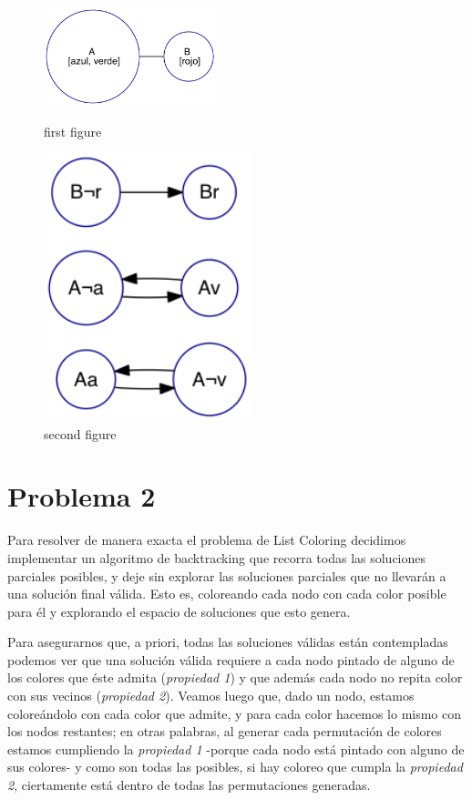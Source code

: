 \documentclass{article}
\theoremstyle{definition}
\theoremstyle{remark}
\begin{document}
\begin{figure}
\centering
\begin{minipage}{0.45\textwidth}
\centering
\includegraphics[width=5cm]{graphs/ej1/ej1_intro_2n.png}
\caption{first figure}
\end{minipage}\hfill
\begin{minipage}{0.45\textwidth}
\centering
\includegraphics[width=6cm]{graphs/ej1/ej1_intro_2n_impl.png}
\caption{second figure}
\end{minipage}
\end{figure}


\section{Problema 2}

Para resolver de manera exacta el problema de List Coloring decidimos implementar un algoritmo de backtracking que recorra todas las soluciones parciales posibles, y deje sin explorar las soluciones parciales que no llevarán a una solución final válida. Esto es, coloreando cada nodo con cada color posible para él y explorando el espacio de soluciones que esto genera. 

Para asegurarnos que, a priori, todas las soluciones válidas están contempladas podemos ver que una solución válida requiere a cada nodo pintado de alguno de los colores que éste admita (\textit{propiedad 1}) y que además cada nodo no repita color con sus vecinos (\textit{propiedad 2}). Veamos luego que, dado un nodo, estamos coloreándolo con cada color que admite, y para cada color hacemos lo mismo con los nodos restantes; en otras palabras, al generar cada permutación de colores estamos cumpliendo la \textit{propiedad 1} -porque cada nodo está pintado con alguno de sus colores- y como son todas las posibles, si hay coloreo que cumpla la \textit{propiedad 2}, ciertamente está dentro de todas las permutaciones generadas. 
\end{document}
